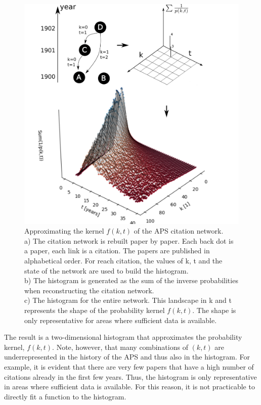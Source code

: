 \documentclass[fleqn,10pt]{wlscirep}
\begin{document}
\begin{figure}[h!]
	\centering
	 \includegraphics[width=0.9\columnwidth]{newman.png}
	\caption{Approximating the kernel $f(k, t)$ of the APS citation network.\\
	a) The citation network is rebuilt paper by paper. Each back dot is a paper, each link is a citation. The papers are published in alphabetical order. For reach citation, the values of k, t and the state of the network are used to build the histogram.\\
	b) The histogram is generated as the sum of the inverse probabilities when reconstructing the citation network. \\
	c) The histogram for the entire network. This landscape in k and t represents the shape of the probability kernel $f(k, t)$. The shape is only representative for areas where sufficient data is available.
	}
	\label{fig_newman}
\end{figure}

The result is a two-dimensional histogram that approximates the probability kernel, $f(k, t)$. Note, however, that many combinations of $(k, t)$ are underrepresented in the history of the APS and thus also in the histogram. For example, it is evident that there are very few papers that have a high number of citations already in the first few years. Thus, the histogram is only representative in areas where sufficient data is available. For this reason, it is not practicable to directly fit a function to the histogram.
\end{document}
